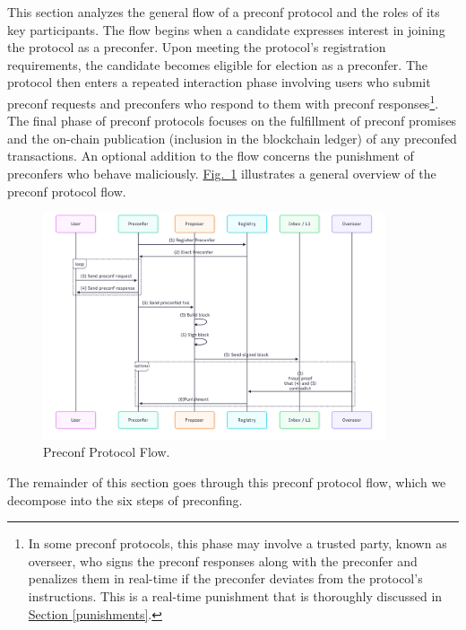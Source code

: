 \documentclass[a4paper]{article}
\theoremstyle{boldstyle}
\begin{document}
This section analyzes the general flow of a preconf protocol and the roles of its key participants. The flow begins when a candidate expresses interest in joining the protocol as a preconfer. Upon meeting the protocol’s registration requirements, the candidate becomes eligible for election as a preconfer. The protocol then enters a repeated interaction phase involving users who submit preconf requests and preconfers who respond to them with preconf responses\footnote{In some preconf protocols, this phase may involve a trusted party, known as overseer, who signs the preconf responses along with the preconfer and penalizes them in real-time if the preconfer deviates from the protocol's instructions. This is a real-time punishment that is thoroughly discussed in \hyperref[punishments]{Section \ref{punishments}}.}. The final phase of preconf protocols focuses on the fulfillment of preconf promises and the on-chain publication (inclusion in the blockchain ledger) of any preconfed transactions. An optional addition to the flow concerns the punishment of preconfers who behave maliciously. \hyperref[preconf_protocol_flow]{Fig.~\ref{preconf_protocol_flow}} illustrates a general overview of the preconf protocol flow.
    \begin{figure}[htbp]
        \centering
        \includegraphics[width=0.9\textwidth]{figures/preconfProtocolFlow.png}
        \caption{Preconf Protocol Flow.}
        \label{preconf_protocol_flow}
    \end{figure}

The remainder of this section goes through this preconf protocol flow, which we decompose into the six steps of preconfing.
\end{document}
